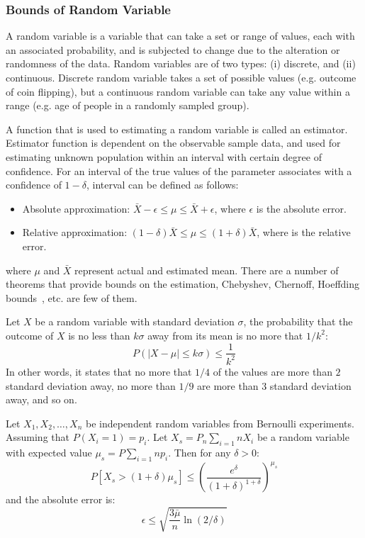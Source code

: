 \subsubsection{Bounds of Random Variable}
A random variable is a variable that can take a set or range of values, each with an associated probability, and is subjected to change due to the alteration or randomness of the data. Random variables are of two types: (i) discrete, and (ii) continuous. Discrete random variable takes a set of possible values (e.g. outcome of coin flipping), but a continuous random variable can take any value within a range (e.g. age of people in a randomly sampled group).

A function that is used to estimating a random variable is called an estimator. Estimator function is dependent on the observable sample data, and used for estimating unknown population within an interval with certain degree of confidence. For an interval of the true values of the parameter associates with a confidence of $1 - \delta$, interval can be defined as follows:
\begin{itemize}    
    \item Absolute approximation: $\bar{X} - \epsilon \le \mu \le \bar{X} + \epsilon$, where $\epsilon$ is the absolute error.
    \item Relative approximation: $(1 - \delta)\bar{X} \le \mu \le (1 + \delta)\bar{X}$, where  is the relative error.
\end{itemize}
where $\mu$ and $\bar{X}$ represent actual and estimated mean. There are a number of theorems that provide bounds on the estimation, Chebyshev, Chernoff, Hoeffding bounds~\cite{hoeffding63:bound}, etc. are few of them.

\begin{theorem}
\label{thm:chebyshev}
    Let $X$ be a random variable with standard deviation $\sigma$, the probability that the outcome of $X$ is no less than $k\sigma$ away from its mean is no more that $1/k^2$:
    \[
        P(|X-\mu| \le k\sigma) \le \frac{1}{k^2}
    \]
    In other words, it states that no more that $1/4$ of the values are more than $2$ standard deviation away, no more than $1/9$ are more than $3$ standard deviation away, and so on.
\end{theorem}

\begin{theorem}
\label{thm:chernoff}
    Let $X_1,X_2,\dots, X_n$ be independent random variables from Bernoulli experiments. Assuming that $P(X_i = 1) = p_i$. Let $X_s = P_n \sum_{i=1}{n} X_i$ be a random variable with expected value $\mu_s = P \sum_{i=1} np_i$. Then for any $\delta > 0$:
    \[
        P[X_s > (1+\delta) \mu_s] \le (\frac{e^\delta}{(1 + \delta)^{1 +\delta}} )  ^{\mu_s}
    \]
    and the absolute error is:
    \[
        \epsilon \le \sqrt{\frac{3 \bar{\mu}}{n} \ln (2/\delta)}
    \]
\end{theorem}

